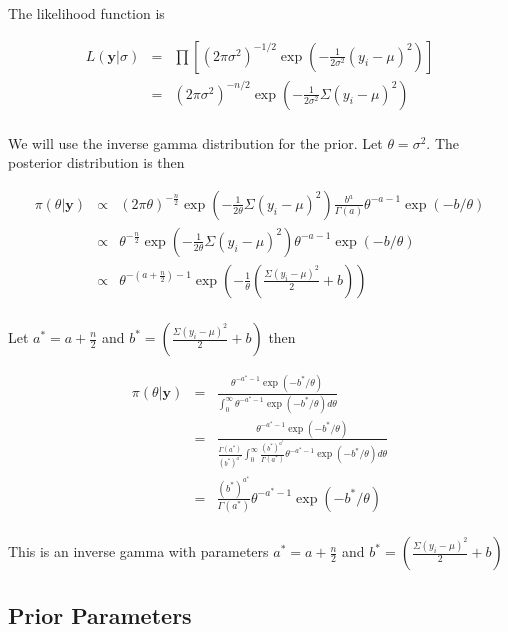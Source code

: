 \documentclass[12pt]{article}
\begin{document}
\noindent The likelihood function is

\begin{eqnarray*}
L(\mathbf{y}|\sigma) &=& \prod\left[(2\pi\sigma^2)^{-1/2}\exp\left(-\frac{1}{2\sigma^2}(y_i-\mu)^2\right)\right] \\
&=& (2\pi\sigma^2)^{-n/2}\exp\left(-\frac{1}{2\sigma^2}\Sigma(y_i-\mu)^2\right) \\
\end{eqnarray*}

\noindent We will use the inverse gamma distribution for the prior.  Let $\theta=\sigma^2$.  The posterior distribution is then

\begin{eqnarray*}
\pi(\theta|\mathbf{y}) &\propto& (2\pi\theta)^{-\frac{n}{2}}\exp\left(-\frac{1}{2\theta}\Sigma(y_i-\mu)^2\right)\frac{b^a}{\Gamma(a)}\theta^{-a-1}\exp(-b/\theta) \\
&\propto& \theta^{-\frac{n}{2}}\exp\left(-\frac{1}{2\theta}\Sigma(y_i-\mu)^2\right)\theta^{-a-1}\exp(-b/\theta) \\
&\propto& \theta^{-(a+\frac{n}{2})-1}\exp\left(-\frac{1}{\theta}\left(\frac{\Sigma(y_i-\mu)^2}{2}+b\right)\right) \\
\end{eqnarray*}

\noindent Let $a^*=a+\frac{n}{2}$ and $b^*=\left(\frac{\Sigma(y_i-\mu)^2}{2}+b\right)$ then

\begin{eqnarray*}
\pi(\theta|\mathbf{y}) &=& \frac{\theta^{-a^*-1}\exp(-b^*/\theta)}{\int_0^\infty\theta^{-a^*-1}\exp(-b^*/\theta)d\theta} \\
&=& \frac{\theta^{-a^*-1}\exp(-b^*/\theta)}{\frac{\Gamma(a^*)}{(b^*)^{a^*}}\int_0^\infty\frac{(b^*)^{a^*}}{\Gamma(a^*)}\theta^{-a^*-1}\exp(-b^*/\theta)d\theta} \\
&=& \frac{(b^*)^{a^*}}{\Gamma(a^*)}\theta^{-a^*-1}\exp(-b^*/\theta) \\
\end{eqnarray*}

\noindent This is an inverse gamma with parameters $a^*=a+\frac{n}{2}$ and $b^*=\left(\frac{\Sigma(y_i-\mu)^2}{2}+b\right)$

\subsection{Prior Parameters}
\end{document}
